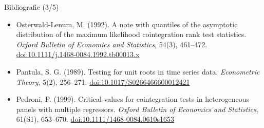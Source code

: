 \begin{frame}{Bibliografie (3/5)}
\begin{itemize}
    \item Osterwald-Lenum, M. (1992). A note with quantiles of the asymptotic distribution of the maximum likelihood cointegration rank test statistics. \textit{Oxford Bulletin of Economics and Statistics}, 54(3), 461--472. \href{https://doi.org/10.1111/j.1468-0084.1992.tb00013.x}{doi:10.1111/j.1468-0084.1992.tb00013.x}
    \item Pantula, S. G. (1989). Testing for unit roots in time series data. \textit{Econometric Theory}, 5(2), 256--271. \href{https://doi.org/10.1017/S0266466600012421}{doi:10.1017/S0266466600012421}
    \item Pedroni, P. (1999). Critical values for cointegration tests in heterogeneous panels with multiple regressors. \textit{Oxford Bulletin of Economics and Statistics}, 61(S1), 653--670. \href{https://doi.org/10.1111/1468-0084.0610s1653}{doi:10.1111/1468-0084.0610s1653}
\end{itemize}
\end{frame}

